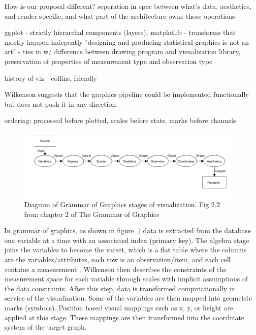 \documentclass[letterpaper,onecolumn,titlepage]{Ythesis}
\begin{document}
How is our proposal different? seperation in spec between what's data, aesthetics, and render specific, and what part of the architecture owns those operations


ggplot - strictly hierarchal components (layers), matplotlib - transforms that mostly happen indepently 
"designing and producing statistical graphics is not an art" - ties in w/ difference between drawing program and visualization library, preservation of properties of measurement type and observation type

\cite{wickhamGgplot2ElegantGraphics2016}

history of viz - collins, friendly


Wilkenson suggests that the graphics pipeline could be implemented functionally but does not push it in any direction. 

ordering: processed before plotted, 
scales before stats, marks before channels
\begin{figure}
\includegraphics[]{figures/intro/gog_pathway.png}
\caption{Diagram of Grammar of Graphics stages of visualization. Fig 2.2 from chapter 2 of The Grammar of Graphics\cite{wilkinsonGrammarGraphics2005}}
\label{fig:gog_pathway}
\end{figure}
In grammar of graphics, as shown in figure~\ref{fig:gog_pathway} data is extracted from the database one variable at a time with an associated index (primary key). The algebra stage joins the variables to become the varset, which is a flat table where the columns are the variables/attributes, each row is an observation/item, and each cell contains a measurement \cite{munznerChDataAbstraction}. Wilkenson then describes the constraints of the measurement space for each variable through scales \cite{wilkinsonGrammarGraphics2005} with implicit assumptions of the data constraints. After this step, data is transformed computationally in service of the visualization. Some of the variables are then mapped into geometric marks (symbols). Position based visual mappings such as x, y, or height are applied at this stage. These mappings are then transformed into the coordinate system of the target graph. 
\end{document}
